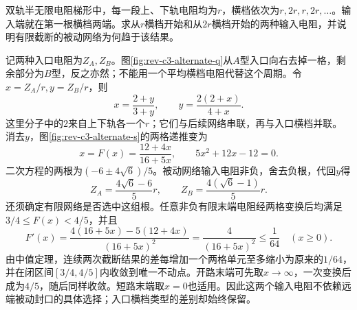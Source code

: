 \begin{exercise}[两种横档交替的半无限梯形]\label{ex:rev-c3-alternate}
双轨半无限电阻梯形中，每一段上、下轨电阻均为$r$，横档依次为$r,2r,r,2r,\ldots$。输入端就在第一根横档两端。求从$r$横档开始和从$2r$横档开始的两种输入电阻，并说明有限截断的被动网络为何趋于该结果。
\end{exercise}
\begin{solution}
记两种入口电阻为$Z_A,Z_B$。图\ref{fig:rev-c3-alternate-q}从$A$型入口向右去掉一格，剩余部分为$B$型，反之亦然；不能用一个平均横档电阻代替这个周期。令$x=Z_A/r,y=Z_B/r$，则
\[
 x=\frac{2+y}{3+y},\qquad
 y=\frac{2(2+x)}{4+x}.
\]
这里分子中的$2$来自上下轨各一个$r$；它们与后续网络串联，再与入口横档并联。
消去$y$，图\ref{fig:rev-c3-alternate-s}的两格递推变为
\[
 x=F(x)=\frac{12+4x}{16+5x},\qquad
 5x^2+12x-12=0.
\]
二次方程的两根为$(-6\pm4\sqrt6)/5$。被动网络输入电阻非负，舍去负根，代回$y$得
\[
 \boxed{Z_A=\frac{4\sqrt6-6}{5}r,\qquad
 Z_B=\frac{4(\sqrt6-1)}5r}.
\]
还须确定有限网络是否选中这组根。任意非负有限末端电阻经两格变换后均满足$3/4\le F(x)<4/5$，并且
\[
 F'(x)=\frac{4(16+5x)-5(12+4x)}{(16+5x)^2}
 =\frac4{(16+5x)^2}\le\frac1{64}\quad(x\ge0).
\]
由中值定理，连续两次截断结果的差每增加一个两格单元至多缩小为原来的$1/64$，并在闭区间$[3/4,4/5]$内收敛到唯一不动点。开路末端可先取$x\to\infty$，一次变换后成为$4/5$，随后同样收敛。短路末端取$x=0$也适用。因此这两个输入电阻不依赖远端被动封口的具体选择；入口横档类型的差别却始终保留。
\end{solution}

